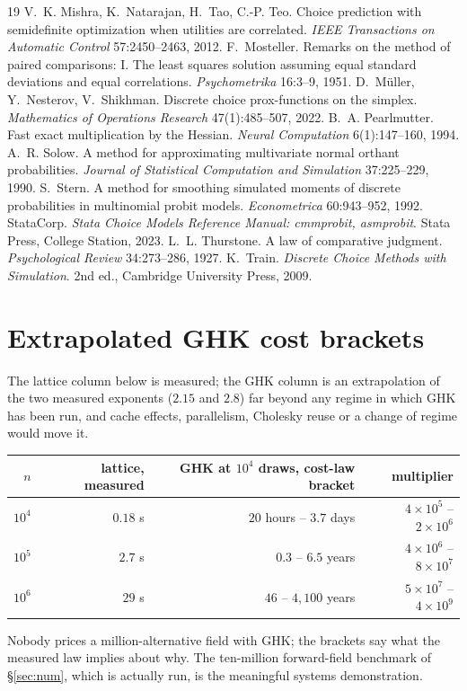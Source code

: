 \documentclass[11pt]{article}
\begin{document}
\begin{thebibliography}{19}
V.~K. Mishra, K.~Natarajan, H.~Tao, C.-P. Teo. Choice prediction with
semidefinite optimization when utilities are correlated. \emph{IEEE
Transactions on Automatic Control} 57:2450--2463, 2012.
 F.~Mosteller. Remarks on the
method of paired comparisons: I. The least squares solution assuming
equal standard deviations and equal correlations. \emph{Psychometrika}
16:3--9, 1951.
D.~M\"uller, Y.~Nesterov, V.~Shikhman. Discrete choice prox-functions on
the simplex. \emph{Mathematics of Operations Research} 47(1):485--507,
2022.
 B.~A. Pearlmutter.
Fast exact multiplication by the Hessian. \emph{Neural Computation}
6(1):147--160, 1994.
 A.~R. Solow.
A method for approximating multivariate normal orthant probabilities.
\emph{Journal of Statistical Computation and Simulation} 37:225--229, 1990.
 S.~Stern.
A method for smoothing simulated moments of discrete probabilities in
multinomial probit models. \emph{Econometrica} 60:943--952, 1992.
 StataCorp.
\emph{Stata Choice Models Reference Manual: cmmprobit, asmprobit}.
Stata Press, College Station, 2023.
 L.~L. Thurstone.
A law of comparative judgment. \emph{Psychological Review} 34:273--286, 1927.
 K.~Train.
\emph{Discrete Choice Methods with Simulation}. 2nd ed., Cambridge University Press, 2009.
\end{thebibliography}
\appendix
\section{Extrapolated GHK cost brackets}\label{app:extrap}

The lattice column below is measured; the GHK column is an
extrapolation of the two measured exponents ($2.15$ and $2.8$) far
beyond any regime in which GHK has been run, and cache effects,
parallelism, Cholesky reuse or a change of regime would move it.

\begin{center}\small
\begin{tabular}{rrrr}
\toprule
$n$ & lattice, measured & GHK at $10^4$ draws, cost-law bracket & multiplier \\
\midrule
$10^4$ & $0.18$ s & $20$ hours -- $3.7$ days & $4\times10^{5}$ -- $2\times10^{6}$ \\
$10^5$ & $2.7$ s & $0.3$ -- $6.5$ years & $4\times10^{6}$ -- $8\times10^{7}$ \\
$10^6$ & $29$ s & $46$ -- $4{,}100$ years & $5\times10^{7}$ -- $4\times10^{9}$ \\
\bottomrule
\end{tabular}
\end{center}

Nobody prices a million-alternative field with GHK; the brackets say
what the measured law implies about why. The ten-million forward-field
benchmark of \S\ref{sec:num}, which is actually run, is the meaningful
systems demonstration.
\end{document}
